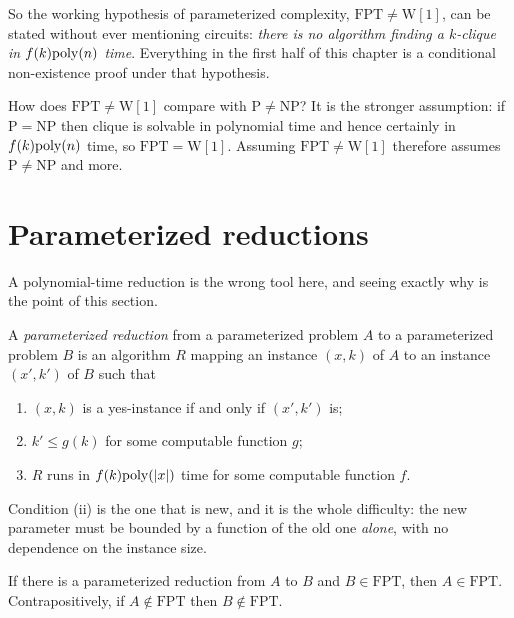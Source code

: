 So the working hypothesis of parameterized complexity, $\mathrm{FPT} \ne
\mathrm{W}[1]$, can be stated without ever mentioning circuits: \emph{there is
no algorithm finding a $k$-clique in $f(k)\mathrm{poly}(n)$ time}. Everything in the
first half of this chapter is a conditional non-existence proof under that
hypothesis.

\begin{remark}\label{rem:w1-vs-pnp}
How does $\mathrm{FPT} \ne \mathrm{W}[1]$ compare with
$\mathrm{P} \ne \mathrm{NP}$? It is the stronger assumption: if
$\mathrm{P} = \mathrm{NP}$ then clique is solvable in polynomial time and hence
certainly in $f(k)\mathrm{poly}(n)$ time, so $\mathrm{FPT} = \mathrm{W}[1]$. Assuming
$\mathrm{FPT} \ne \mathrm{W}[1]$ therefore assumes
$\mathrm{P} \ne \mathrm{NP}$ and more.
\end{remark}

\section{Parameterized reductions}
\label{sec:parameterized-reductions}

A polynomial-time reduction is the wrong tool here, and seeing exactly why is
the point of this section.

\begin{definition}\label{def:parameterized-reduction}
A \emph{parameterized reduction} from a parameterized problem $A$ to a
parameterized problem $B$ is an algorithm $R$ mapping an instance $(x,k)$ of
$A$ to an instance $(x',k')$ of $B$ such that
\begin{enumerate}[label=(\roman*),leftmargin=*,nosep]
  \item $(x,k)$ is a yes-instance if and only if $(x',k')$ is;
  \item $k' \le g(k)$ for some computable function $g$;
  \item $R$ runs in $f(k)\mathrm{poly}(|x|)$ time for some computable function $f$.
\end{enumerate}
\end{definition}

Condition (ii) is the one that is new, and it is the whole difficulty: the new
parameter must be bounded by a function of the old one \emph{alone}, with no
dependence on the instance size.

\begin{lemma}\label{lem:param-reduction-works}
If there is a parameterized reduction from $A$ to $B$ and $B \in \mathrm{FPT}$,
then $A \in \mathrm{FPT}$. Contrapositively, if $A \notin \mathrm{FPT}$ then
$B \notin \mathrm{FPT}$.
\end{lemma}

